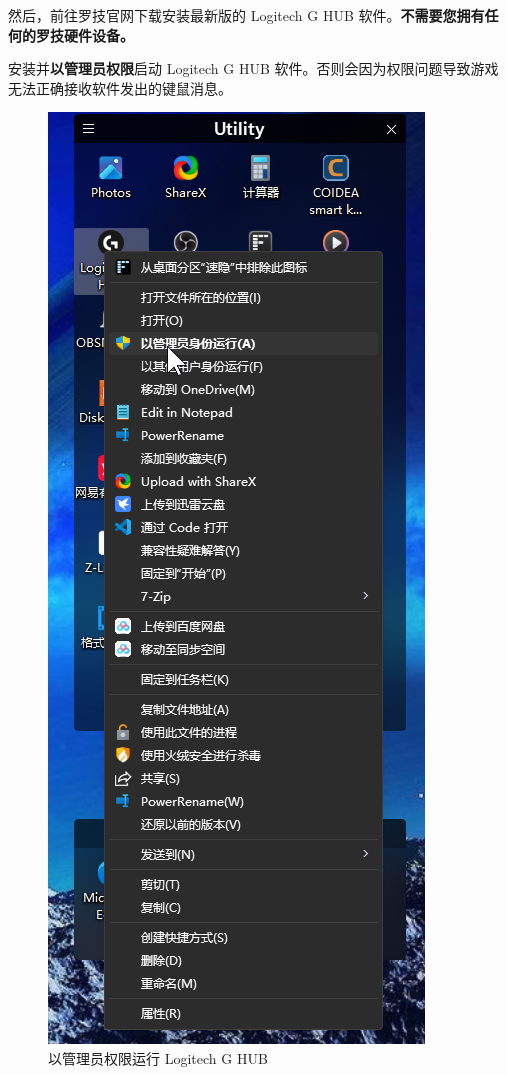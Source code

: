 然后，前往罗技官网下载安装最新版的 Logitech G HUB 软件。\textbf{\color{red}不需要您拥有任何的罗技硬件设备。}

安装并\textbf{\color{red}以管理员权限}启动 Logitech G HUB 软件。否则会因为权限问题导致游戏无法正确接收软件发出的键鼠消息。

\begin{figure}[H]
    \Centering
    \includegraphics[width=\textwidth]{docs/assets/run_lghub.png}
    \caption{以管理员权限运行 Logitech G HUB}
\end{figure}

